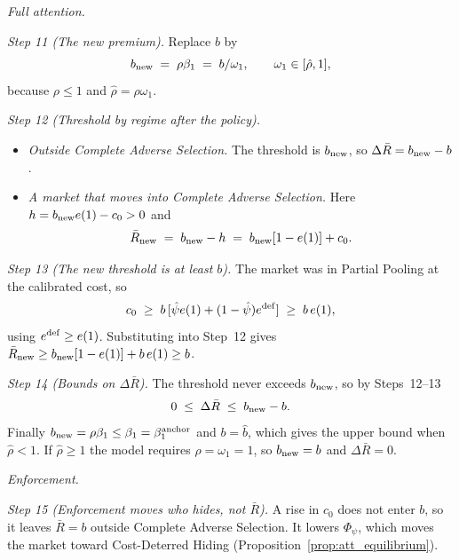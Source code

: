 \medskip\noindent\emph{Full attention.}

\emph{Step 11 (The new premium).} Replace $b$ by
\begin{equation*}
    b_{\rm new}\;=\;\rho\beta_1\;=\;b/\omega_1,\qquad \omega_1\in[\hat\rho,1],
\end{equation*}
because $\rho\le1$ and $\hat\rho=\rho\omega_1$.

\emph{Step 12 (Threshold by regime after the policy).}
\begin{itemize}
    \item \emph{Outside Complete Adverse Selection.} The threshold is $b_{\rm new}$, so $\Delta\bar R=b_{\rm new}-b$.
    \item \emph{A market that moves into Complete Adverse Selection.} Here $h=b_{\rm new}e(1)-c_0>0$ and
    \begin{equation*}
        \bar R_{\rm new}\;=\;b_{\rm new}-h\;=\;b_{\rm new}[1-e(1)]+c_0.
    \end{equation*}
\end{itemize}

\emph{Step 13 (The new threshold is at least $b$).} The market was in Partial Pooling at the calibrated cost, so
\begin{equation*}
    c_0\;\ge\;b\,[\hat\psi e(1)+(1-\hat\psi)e^{\rm def}]\;\ge\;b\,e(1),
\end{equation*}
using $e^{\rm def}\ge e(1)$. Substituting into Step~12 gives $\bar R_{\rm new}\ge b_{\rm new}[1-e(1)]+b\,e(1)\ge b$.

\emph{Step 14 (Bounds on $\Delta\bar R$).} The threshold never exceeds $b_{\rm new}$, so by Steps~12--13
\begin{equation*}
    0\;\le\;\Delta\bar R\;\le\;b_{\rm new}-b.
\end{equation*}
Finally $b_{\rm new}=\rho\beta_1\le\beta_1=\beta_1^{\rm anchor}$ and $b=\hat b$, which gives the upper bound when $\hat\rho<1$. If $\hat\rho\ge1$ the model requires $\rho=\omega_1=1$, so $b_{\rm new}=b$ and $\Delta\bar R=0$.

\medskip\noindent\emph{Enforcement.}

\emph{Step 15 (Enforcement moves who hides, not $\bar R$).} A rise in $c_0$ does not enter $b$, so it leaves $\bar R=b$ outside Complete Adverse Selection. It lowers $\Phi_\psi$, which moves the market toward Cost-Deterred Hiding (Proposition~\ref{prop:att_equilibrium}).
